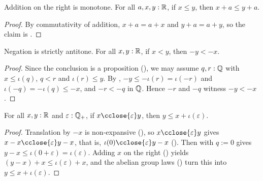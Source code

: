 \begin{corollary}
  \label{plusMonoRLeReal}
  Addition on the right is monotone. For all $a,x,y : \mathbb{R}$, if $x\le y$, then $x+a\le y+a$.
\end{corollary}
\begin{proof}
  By commutativity of addition, $x+a = a+x$ and $y+a = a+y$, so the claim is .
\end{proof}



\begin{lemma}
  \label{negFlipLtReal}
  Negation is strictly antitone. For all $x, y : \mathbb{R}$, if $x < y$, then $-y < -x$.
\end{lemma}
\begin{proof}
  Since the conclusion is a proposition (), we may assume $q, r : \mathbb{Q}$ with $x \le \iota(q)$, $q < r$ and $\iota(r) \le y$. By , $-y \le -\iota(r) = \iota(-r)$ and $\iota(-q) = -\iota(q) \le -x$, and $-r < -q$ in $\mathbb{Q}$. Hence $-r$ and $-q$ witness $-y < -x$.
\end{proof}

\begin{lemma}
  \label{closeLeAddRatReal}
  For all $x, y : \mathbb{R}$ and $\varepsilon : \mathbb{Q}_{+}$, if $x \cclose{\varepsilon} y$, then $y \le x + \iota(\varepsilon)$.
\end{lemma}
\begin{proof}
  Translation by $-x$ is non-expansive (), so $x \cclose{\varepsilon} y$ gives $x - x \cclose{\varepsilon} y - x$, that is, $\iota(0) \cclose{\varepsilon} y - x$ (). Then  with $q := 0$ gives $y - x \le \iota(0 + \varepsilon) = \iota(\varepsilon)$. Adding $x$ on the right () yields $(y - x) + x \le \iota(\varepsilon) + x$, and the abelian group laws () turn this into $y \le x + \iota(\varepsilon)$.
\end{proof}

